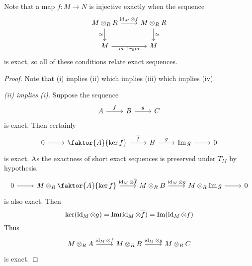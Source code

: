 Note that a map \( f : M \to N \) is injective exactly when the sequence
\[\begin{tikzcd}
	{M \otimes_R R} & {M \otimes_R R} \\
	M & M
	\arrow["{\id_M \otimes f}", from=1-1, to=1-2]
	\arrow["\simeq", from=1-2, to=2-2]
	\arrow["\simeq"', from=1-1, to=2-1]
	\arrow["{m \mapsto r_0 m}"', from=2-1, to=2-2]
\end{tikzcd}\]
is exact, so all of these conditions relate exact sequences.
\begin{proof}
    Note that (i) implies (ii) which implies (iii) which implies (iv).

    \emph{(ii) implies (i).}
    Suppose the sequence
\[\begin{tikzcd}
	A & B & C
	\arrow["f", from=1-1, to=1-2]
	\arrow["g", from=1-2, to=1-3]
\end{tikzcd}\]
    is exact.
    Then certainly
\[\begin{tikzcd}
	0 & {\faktor{A}{\ker f}} & B & {\Im g} & 0
	\arrow[from=1-1, to=1-2]
	\arrow["{\overline f}", from=1-2, to=1-3]
	\arrow["g", from=1-3, to=1-4]
	\arrow[from=1-4, to=1-5]
\end{tikzcd}\]
    is exact.
    As the exactness of short exact sequences is preserved under \( T_M \) by hypothesis,
\[\begin{tikzcd}
	0 & {M \otimes_R \faktor{A}{\ker f}} & {M \otimes_R B} & {M \otimes_R \Im g} & 0
	\arrow[from=1-1, to=1-2]
	\arrow["{\id_M \otimes \overline f}", from=1-2, to=1-3]
	\arrow["{\id_M \otimes g}", from=1-3, to=1-4]
	\arrow[from=1-4, to=1-5]
\end{tikzcd}\]
    is also exact.
    Then
    \[ \ker (\operatorname{id}_M \otimes g) = \operatorname{Im} (\operatorname{id}_M \otimes \overline f) = \operatorname{Im} (\operatorname{id}_M \otimes f) \]
    Thus
\[\begin{tikzcd}
	{M \otimes_R A} & {M \otimes_R B} & {M \otimes_R C}
	\arrow["{\id_M \otimes f}", from=1-1, to=1-2]
	\arrow["{\id_M \otimes g}", from=1-2, to=1-3]
\end{tikzcd}\]
    is exact.


\end{proof}
